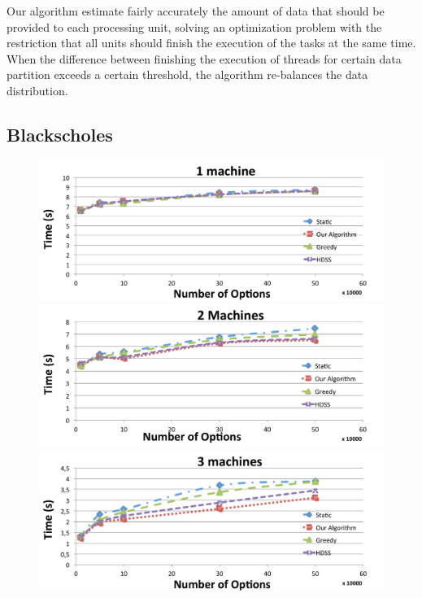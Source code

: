 \documentclass[journal]{IEEEtran}
\begin{document}
Our algorithm estimate fairly accurately the amount of data that should be
provided to each processing unit, solving an optimization problem with the
restriction that all units should finish the execution of the tasks at the same
time. When the difference between finishing the execution of threads for certain
data partition exceeds a certain threshold, the algorithm re-balances the data
distribution.

\subsection{Blackscholes}

\begin{figure}[htb]
	\begin{center}
	\centering
		\includegraphics[scale=0.3]{1machineBlack.pdf} \quad
		\includegraphics[scale=0.3]{2machineBlack.pdf} \quad
		\includegraphics[scale=0.3]{3machineBlack.pdf} \quad

\end{center}
\end{figure}
\end{document}
